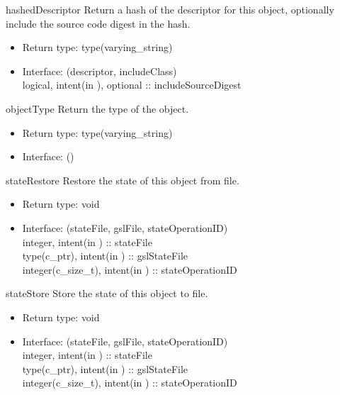 \begin{description}
\item[]{\normalfont \ttfamily hashedDescriptor} Return a hash of the descriptor for this object, optionally include the source code digest in the hash.
\begin{itemize}
\item Return type: {\normalfont \ttfamily type(varying\_string)}
\item Interface: {\normalfont \ttfamily (descriptor, includeClass)}\\
  {\normalfont \ttfamily logical, intent(in   ), optional :: includeSourceDigest}\\
\end{itemize}

\item[]{\normalfont \ttfamily objectType} Return the type of the object. 
\begin{itemize}
\item Return type: {\normalfont \ttfamily type(varying\_string)}
\item Interface: {\normalfont \ttfamily ()}\\
\end{itemize}

\item[]{\normalfont \ttfamily stateRestore} Restore the state of this object from file.
\begin{itemize}
\item Return type: {\normalfont \ttfamily void}
\item Interface: {\normalfont \ttfamily (stateFile, gslFile, stateOperationID)}\\
  {\normalfont \ttfamily integer, intent(in   ) :: stateFile}\\
  {\normalfont \ttfamily type(c\_ptr), intent(in   ) :: gslStateFile}\\
  {\normalfont \ttfamily integer(c\_size\_t), intent(in   ) :: stateOperationID}\\
\end{itemize}

\item[]{\normalfont \ttfamily stateStore} Store the state of this object to file.
\begin{itemize}
\item Return type: {\normalfont \ttfamily void}
\item Interface: {\normalfont \ttfamily (stateFile, gslFile, stateOperationID)}\\
  {\normalfont \ttfamily integer, intent(in   ) :: stateFile}\\
  {\normalfont \ttfamily type(c\_ptr), intent(in   ) :: gslStateFile}\\
  {\normalfont \ttfamily integer(c\_size\_t), intent(in   ) :: stateOperationID}\\
\end{itemize}

\end{description}
 

